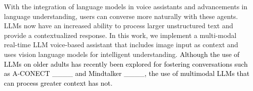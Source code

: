 With the integration of language models in voice assistants and advancements in language understanding, users can converse more naturally with these agents. LLMs now have an increased ability to process larger unstructured text and provide a contextualized response. In this work, we implement a multi-modal real-time LLM voice-based assistant that includes image input as context and uses vision language models for intelligent understanding. \textcolor{black}{Although the use of LLMs on older adults has recently been explored for fostering conversations such as A-CONECT ____ and Mindtalker ____, the use of multimodal LLMs that can process greater context has not.}


